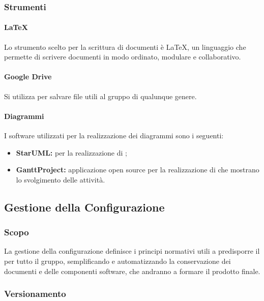 	\subsubsection{Strumenti}
			\paragraph{LaTeX}
			Lo strumento scelto per la scrittura di documenti è \LaTeX{}, un linguaggio che permette di scrivere documenti in modo ordinato, modulare e collaborativo.
			\paragraph{Google Drive}
			Si utilizza  per salvare file utili al gruppo di qualunque genere.
			\paragraph{Diagrammi}
				I software utilizzati per la realizzazione dei diagrammi sono i seguenti:
				\begin{itemize}
					\item \textbf{StarUML:} per la realizzazione di ;
					\item \textbf{GanttProject:} applicazione open source per la realizzazione di  che mostrano lo svolgimento delle attività.
				\end{itemize}
			
	\subsection{Gestione della Configurazione}
		\subsubsection{Scopo}
			La gestione della configurazione definisce i principi normativi utili a predisporre il  per tutto il gruppo, semplificando e automatizzando la conservazione dei documenti e delle componenti software, che andranno a formare il prodotto finale.
		\subsubsection{Versionamento}
